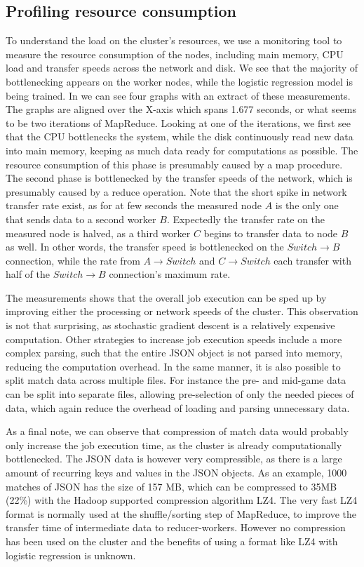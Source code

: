 \subsection{Profiling resource consumption}\label{sec:profile}
To understand the load on the cluster's resources, we use a monitoring tool to measure the resource consumption of the nodes, including main memory, CPU load and transfer speeds across the network and disk. We see that the majority of bottlenecking appears on the worker nodes, while the logistic regression model is being trained. In %
we can see four graphs with an extract of these measurements. The graphs are aligned over the X-axis which spans 1.677 seconds, or what seems to be two iterations of MapReduce. Looking at one of the iterations, we first see that the CPU bottlenecks the system, while the disk continuously read new data into main memory, keeping as much data ready for computations as possible. The resource consumption of this phase is presumably caused by a map procedure. The second phase is bottlenecked by the transfer speeds of the network, which is presumably caused by a reduce operation. Note that the short spike in network transfer rate exist, as for at few seconds the measured node $A$ is the only one that sends data to a second worker $B$. Expectedly the transfer rate on the measured node is halved, as a third worker $C$ begins to transfer data to node $B$ as well. In other words, the transfer speed is bottlenecked on the $Switch \rightarrow B$ connection, while the rate from $A \rightarrow Switch$ and $C \rightarrow Switch$ each transfer with half of the $Switch \rightarrow B$ connection's maximum rate.

The measurements shows that the overall job execution can be sped up by improving either the processing or network speeds of the cluster. This observation is not that surprising, as stochastic gradient descent is a relatively expensive computation. Other strategies to increase job execution speeds include a more complex parsing, such that the entire JSON object is not parsed into memory, reducing the computation overhead. In the same manner, it is also possible to split match data across multiple files. For instance the pre- and mid-game data can be split into separate files, allowing pre-selection of only the needed pieces of data, which again reduce the overhead of loading and parsing unnecessary data.

As a final note, we can observe that compression of match data would probably only increase the job execution time, as the cluster is already computationally bottlenecked. The JSON data is however very compressible, as there is a large amount of recurring keys and values in the JSON objects. As an example, 1000 matches of JSON has the size of 157 MB, which can be compressed to 35MB (22\%) with the Hadoop supported compression algorithm LZ4. The very fast LZ4 format is normally used at the shuffle/sorting step of MapReduce, to improve the transfer time of intermediate data to reducer-workers. However no compression has been used on the cluster and the benefits of using a format like LZ4 with logistic regression is unknown.

%

\FloatBarrier